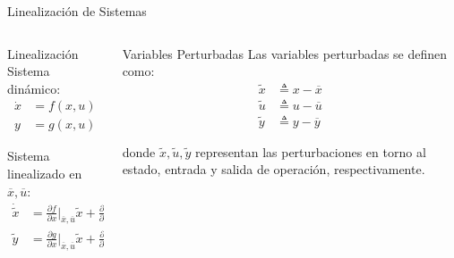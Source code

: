 \documentclass[
    10pt,
    aspectratio=169,
    xcolor={dvipsnames},
    spanish,
    ]{beamer}
\begin{document}
\begin{frame}{Linealización de Sistemas}
\begin{columns}
  \begin{column}{0.48\textwidth}
    \begin{block}{Linealización}
      \scriptsize
      Sistema dinámico:
      \begin{align}
        \dot{x} &= f(x, u) \\
        y &= g(x, u)
      \end{align}
      
      Sistema linealizado en $\overline{x}, \overline{u}$:
      \begin{align}
        \dot{\tilde{x}} &= \frac{\partial f}{\partial x}\bigg|_{\overline{x},\overline{u}} \tilde{x} + \frac{\partial f}{\partial u}\bigg|_{\overline{x},\overline{u}} \tilde{u} \\
        \tilde{y} &= \frac{\partial g}{\partial x}\bigg|_{\overline{x},\overline{u}} \tilde{x} + \frac{\partial g}{\partial u}\bigg|_{\overline{x},\overline{u}} \tilde{u}
      \end{align}
    \end{block}
  \end{column}
  
  \begin{column}{0.48\textwidth}
    \begin{block}{Variables Perturbadas}
      \scriptsize
      Las variables perturbadas se definen como:
      \begin{align}
        \tilde{x} &\triangleq x - \overline{x} \\
        \tilde{u} &\triangleq u - \overline{u} \\
        \tilde{y} &\triangleq y - \overline{y}
      \end{align}
      
      donde $\tilde{x}, \tilde{u}, \tilde{y}$ representan las perturbaciones en torno al estado, entrada y salida de operación, respectivamente.
    \end{block}
  \end{column}
\end{columns}
\end{frame}



\end{document}
